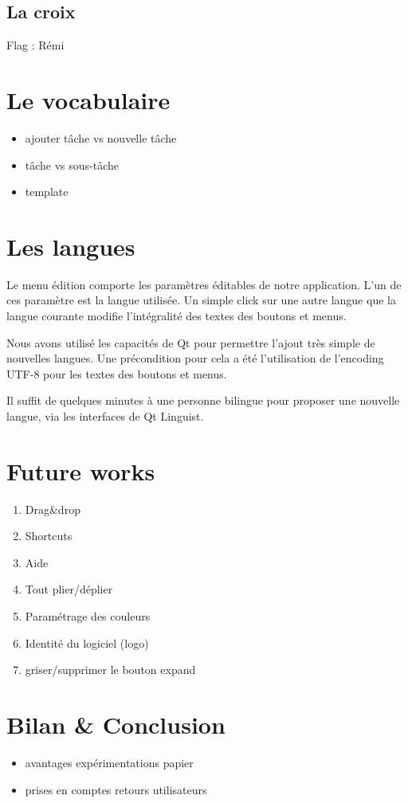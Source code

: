 \documentclass[11pt]{article}
\begin{document}
\subsection{La croix}
Flag : Rémi 


\section{Le vocabulaire}

\begin{itemize}
\item ajouter tâche vs nouvelle tâche
\item tâche vs sous-tâche
\item template
\end{itemize}


\section{Les langues}

Le menu édition comporte les paramètres éditables de notre
application. L'un de ces paramètre est la langue utilisée. Un simple
click sur une autre langue que la langue courante modifie
l'intégralité des textes des boutons et menus.

Nous avons utilisé les capacités de Qt pour permettre l'ajout très
simple de nouvelles langues. Une précondition pour cela a été
l'utilisation de l'encoding UTF-8 pour les textes des boutons et
menus.

Il suffit de quelques minutes à une personne bilingue pour proposer
une nouvelle langue, via les interfaces de Qt Linguist.


\section{Future works}
\begin{enumerate}
\item Drag\&drop
\item Shortcuts
\item Aide
\item Tout plier/déplier
\item Paramétrage des couleurs
\item Identité du logiciel (logo)
\item griser/supprimer le bouton expand
\end{enumerate}


\section{Bilan \& Conclusion}
\begin{itemize}
\item avantages expérimentations papier
\item prises en comptes retours utilisateurs
\end{itemize}
\end{document}

